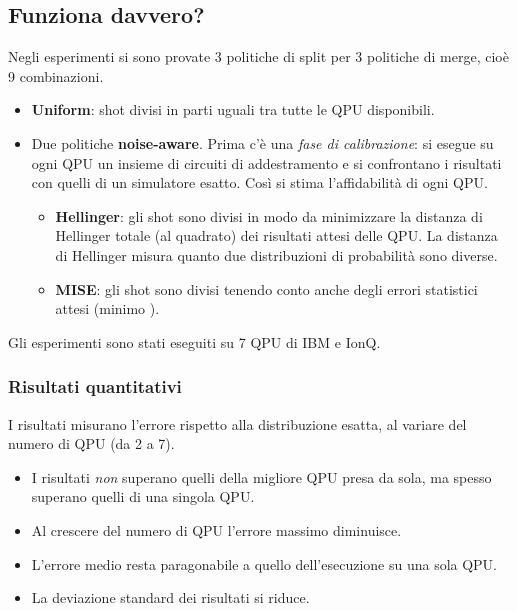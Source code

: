 \subsection{Funziona davvero?}

Negli esperimenti si sono provate 3 politiche di split per 3 politiche di merge, cioè 9 combinazioni.
\begin{itemize}
  \item \textbf{Uniform}: shot divisi in parti uguali tra tutte le QPU disponibili.
  \item Due politiche \textbf{noise-aware}. Prima c'è una \emph{fase di calibrazione}: si esegue su ogni QPU un insieme
    di circuiti di addestramento e si confrontano i risultati con quelli di un simulatore esatto. Così si stima
    l'affidabilità di ogni QPU.
    \begin{itemize}
      \item \textbf{Hellinger}: gli shot sono divisi in modo da minimizzare la distanza di Hellinger totale (al
        quadrato) dei risultati attesi delle QPU. La distanza di Hellinger misura quanto due distribuzioni di
        probabilità sono diverse.
      \item \textbf{MISE}: gli shot sono divisi tenendo conto anche degli errori statistici attesi (minimo
        ).
    \end{itemize}
\end{itemize}
Gli esperimenti sono stati eseguiti su 7 QPU di IBM e IonQ.

\subsubsection{Risultati quantitativi}
I risultati misurano l'errore rispetto alla distribuzione esatta, al variare del numero di QPU (da 2 a 7).
\begin{itemize}
  \item I risultati \emph{non} superano quelli della migliore QPU presa da sola, ma spesso superano quelli di una
    singola QPU.
  \item Al crescere del numero di QPU l'errore massimo diminuisce.
  \item L'errore medio resta paragonabile a quello dell'esecuzione su una sola QPU.
  \item La deviazione standard dei risultati si riduce.
\end{itemize}

